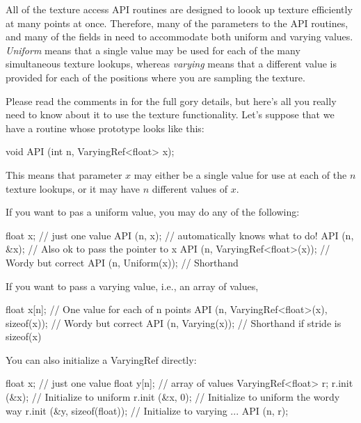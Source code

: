 All of the texture access API routines are designed to loook up
texture efficiently at many points at once.  Therefore, many of
the parameters to the API routines, and many of the fields in
\TextureOptions need to accommodate both uniform and varying values.
\emph{Uniform} means that a single value may be used for each of
the many simultaneous texture lookups, whereas \emph{varying} means
that a different value is provided for each of the positions where
you are sampling the texture.

Please read the comments in  for the full gory 
details, but here's all you really need to know about it to use the
texture functionality.  Let's suppose that we have a routine 
whose prototype looks like this:

\begin{code}
        void API (int n, VaryingRef<float> x);
\end{code}

\noindent This means that parameter $x$ may either be a single value
for use at each of the $n$ texture lookups, or it may have $n$ different
values of $x$.  

If you want to pas a uniform value, you may do any of the following:

\begin{code}
      float x;   // just one value
      API (n, x);   // automatically knows what to do!
      API (n, &x);  // Also ok to pass the pointer to x
      API (n, VaryingRef<float>(x));  // Wordy but correct
      API (n, Uniform(x));  // Shorthand
\end{code}

If you want to pass a varying value, i.e., an array of values,

\begin{code}
      float x[n];   // One value for each of n points
      API (n, VaryingRef<float>(x), sizeof(x));  // Wordy but correct
      API (n, Varying(x));  // Shorthand if stride is sizeof(x)
\end{code}

You can also initialize a VaryingRef directly:

\begin{code}
    float x;     // just one value
    float y[n];  // array of values
    VaryingRef<float> r;
    r.init (&x);                 // Initialize to uniform
    r.init (&x, 0);              // Initialize to uniform the wordy way
    r.init (&y, sizeof(float));  // Initialize to varying
    ...
    API (n, r);
\end{code}

